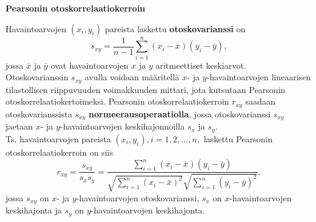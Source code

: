 \documentclass[
]{book}
\begin{document}
\begin{defblock}{}
\textbf{Pearsonin otoskorrelaatiokerroin}

Havaintoarvojen \((x_i, y_i)\) pareista laskettu \textbf{otoskovarianssi} on
\[
s_{xy} = \frac{1}{n-1} \sum_{i=1}^{n} (x_i - \bar{x}) (y_i - \bar{y}),
\]
jossa \(\bar{x}\) ja \(\bar{y}\) ovat havaintoarvojen \(x\) ja \(y\) aritmeettiset keskiarvot.\\
Otoskovarianssin \(s_{xy}\) avulla voidaan määritellä \(x\)- ja \(y\)-havaintoarvojen lineaarisen tilastollisen riippuvuuden voimakkuuden mittari, jota kutsutaan Pearsonin otoskorrelaatiokertoimeksi. Pearsonin otoskorrelaatiokerroin \(r_{xy}\) saadaan otoskovarianssista \(s_{xy}\) \textbf{normeerausoperaatiolla}, jossa otoskovarianssi \(s_{xy}\) jaetaan \(x\)- ja \(y\)-havaintoarvojen keskihajonnoilla \(s_x\) ja \(s_y\).\\
Ts. havaintoarvojen pareista \((x_i, y_i), i = 1, 2, \ldots, n,\) laskettu Pearsonin otoskorrelaatiokerroin on siis
\[
r_{xy} = \frac{s_{xy}}{s_x s_y} = \frac{\sum_{i=1}^{n} (x_i - \bar{x}) (y_i - \bar{y})}{\sqrt{\sum_{i=1}^{n} (x_i - \bar{x})^2} \sqrt{\sum_{i=1}^{n} (y_i - \bar{y})^2}} , 
\]
jossa \(s_{xy}\) on \(x\)- ja \(y\)-havaintoarvojen otoskovarianssi, \(s_x\) on \(x\)-havaintoarvojen keskihajonta ja \(s_y\) on \(y\)-havaintoarvojen keskihajonta.

\end{defblock}
\end{document}
